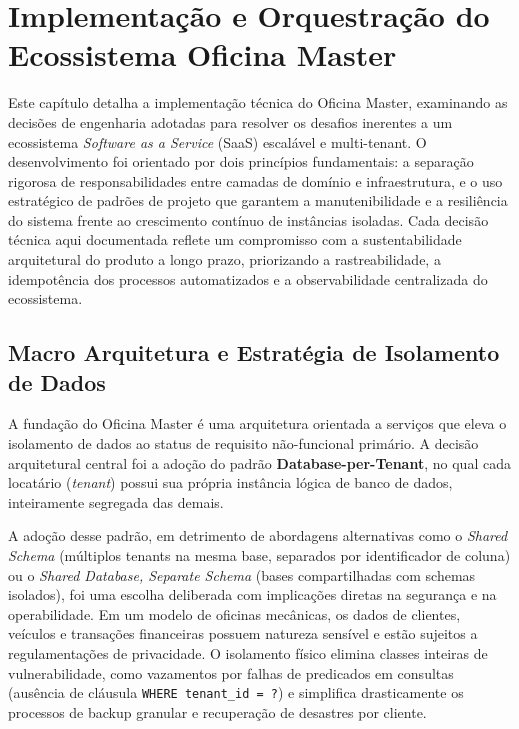 
\chapter{Implementação e Orquestração do Ecossistema Oficina Master}
\label{cap:desenvolvimento}

Este capítulo detalha a implementação técnica do Oficina Master, examinando
as decisões de engenharia adotadas para resolver os desafios inerentes a um
ecossistema \textit{Software as a Service} (SaaS) escalável e multi-tenant.
O desenvolvimento foi orientado por dois princípios fundamentais: a separação
rigorosa de responsabilidades entre camadas de domínio e infraestrutura, e o
uso estratégico de padrões de projeto que garantem a manutenibilidade e a
resiliência do sistema frente ao crescimento contínuo de instâncias isoladas.
Cada decisão técnica aqui documentada reflete um compromisso com a
sustentabilidade arquitetural do produto a longo prazo, priorizando a
rastreabilidade, a idempotência dos processos automatizados e a observabilidade
centralizada do ecossistema.


\section{Macro Arquitetura e Estratégia de Isolamento de Dados}

A fundação do Oficina Master é uma arquitetura orientada a serviços que eleva
o isolamento de dados ao status de requisito não-funcional primário. A decisão
arquitetural central foi a adoção do padrão \textbf{Database-per-Tenant}, no
qual cada locatário (\textit{tenant}) possui sua própria instância lógica de
banco de dados, inteiramente segregada das demais.

A adoção desse padrão, em detrimento de abordagens alternativas como o
\textit{Shared Schema} (múltiplos tenants na mesma base, separados por
identificador de coluna) ou o \textit{Shared Database, Separate Schema} (bases
compartilhadas com schemas isolados), foi uma escolha deliberada com implicações
diretas na segurança e na operabilidade. Em um modelo de oficinas mecânicas,
os dados de clientes, veículos e transações financeiras possuem natureza
sensível e estão sujeitos a regulamentações de privacidade. O isolamento físico
elimina classes inteiras de vulnerabilidade, como vazamentos por falhas de
predicados em consultas (ausência de cláusula \texttt{WHERE tenant\_id = ?}) e
simplifica drasticamente os processos de backup granular e recuperação de
desastres por cliente.

